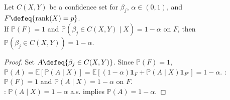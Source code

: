 \begin{proposition} \label{prop:fixed-design-intervals-unconditional-coverage} \\
Let $C(X,Y)$ be a confidence set for $\beta_j$, $\alpha\in(0,1)$, and $F\defeq\{\operatorname{rank}(X)=p\}$.\\
If $\mathbb{P}(F)=1$ and $\mathbb{P}(\beta_j\in C(X,Y)\mid X)=1-\alpha$ on $F$, then $\mathbb{P}(\beta_j\in C(X,Y))=1-\alpha$.
\begin{proof}
Set $A\defeq\{\beta_j\in C(X,Y)\}$. Since $\mathbb{P}(F)=1$, $\mathbb{P}(A)=\mathbb{E}[\mathbb{P}(A\mid X)]=\mathbb{E}[(1-\alpha)\mathbf{1}_F+\mathbb{P}(A\mid X)\mathbf{1}_{F^c}]=1-\alpha$.
: $\mathbb{P}(F)=1$ and $\mathbb{P}(A\mid X)=1-\alpha$ on $F$.\\
: $\mathbb{P}(A\mid X)=1-\alpha$ a.s. implies $\mathbb{P}(A)=1-\alpha$.
\end{proof}
\end{proposition}

